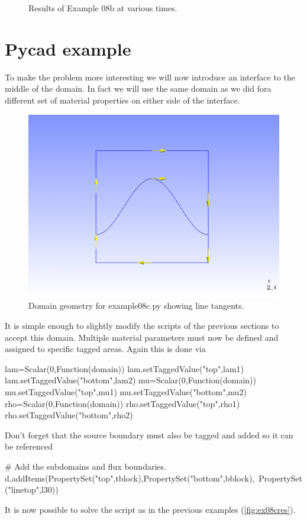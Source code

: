 \begin{figure}[htp]
{\label{fig:ex08pw880}
}
\label{fig:ex08pw}
\caption{Results of Example 08b at various times.}
\end{figure}
\clearpage

\section{Pycad example}
To make the problem more interesting we will now introduce an interface to the
middle of the domain. In fact we will use the same domain as we did fora
different set of material properties on either side of the interface.

\begin{figure}[ht]
\begin{center}
\includegraphics[width=5in]{figures/gmsh-example08c.png}
\caption{Domain geometry for example08c.py showing line tangents.}
\label{fig:ex08cgeo}
\end{center}
\end{figure}

It is simple enough to slightly modify the scripts of the previous sections to
accept this domain. Multiple material parameters must now be defined and assigned
to specific tagged areas. Again this is done via
\begin{python}
lam=Scalar(0,Function(domain))
lam.setTaggedValue("top",lam1)
lam.setTaggedValue("bottom",lam2)
mu=Scalar(0,Function(domain))
mu.setTaggedValue("top",mu1)
mu.setTaggedValue("bottom",mu2)
rho=Scalar(0,Function(domain))
rho.setTaggedValue("top",rho1)
rho.setTaggedValue("bottom",rho2)
\end{python}
Don't forget that the source boundary must also be tagged and added so it can
be referenced 
\begin{python}
# Add the subdomains and flux boundaries.
d.addItems(PropertySet("top",tblock),PropertySet("bottom",bblock),\
                                     PropertySet("linetop",l30))
\end{python}
It is now possible to solve the script as in the previous examples
(\autoref{fig:ex08cres}).

